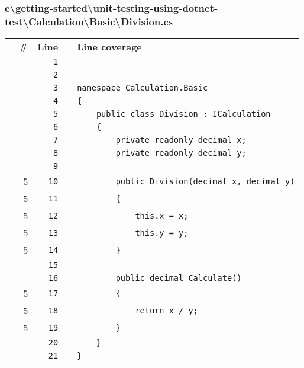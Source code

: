 \documentclass[a4paper,landscape,10pt]{article}
\begin{document}
\subsubsection{e\textbackslash getting-started\textbackslash unit-testing-using-dotnet-test\textbackslash Calculation\textbackslash Basic\textbackslash Division.cs}
\begin{longtable}[l]{lrrll}
\textbf{} & \textbf{\#} & \textbf{Line} & \textbf{} & \textbf{Line coverage}\\
\cellcolor{gray} &  & \verb~1~ & & \verb~~\\
\cellcolor{gray} &  & \verb~2~ & & \verb~~\\
\cellcolor{gray} &  & \verb~3~ & & \verb~namespace Calculation.Basic~\\
\cellcolor{gray} &  & \verb~4~ & & \verb~{~\\
\cellcolor{gray} &  & \verb~5~ & & \verb~    public class Division : ICalculation~\\
\cellcolor{gray} &  & \verb~6~ & & \verb~    {~\\
\cellcolor{gray} &  & \verb~7~ & & \verb~        private readonly decimal x;~\\
\cellcolor{gray} &  & \verb~8~ & & \verb~        private readonly decimal y;~\\
\cellcolor{gray} &  & \verb~9~ & & \verb~~\\
\cellcolor{green} & 5 & \verb~10~ & & \verb~        public Division(decimal x, decimal y)~\\
\cellcolor{green} & 5 & \verb~11~ & & \verb~        {~\\
\cellcolor{green} & 5 & \verb~12~ & & \verb~            this.x = x;~\\
\cellcolor{green} & 5 & \verb~13~ & & \verb~            this.y = y;~\\
\cellcolor{green} & 5 & \verb~14~ & & \verb~        }~\\
\cellcolor{gray} &  & \verb~15~ & & \verb~~\\
\cellcolor{gray} &  & \verb~16~ & & \verb~        public decimal Calculate()~\\
\cellcolor{green} & 5 & \verb~17~ & & \verb~        {~\\
\cellcolor{green} & 5 & \verb~18~ & & \verb~            return x / y;~\\
\cellcolor{green} & 5 & \verb~19~ & & \verb~        }~\\
\cellcolor{gray} &  & \verb~20~ & & \verb~    }~\\
\cellcolor{gray} &  & \verb~21~ & & \verb~}~\\
\end{longtable}
\newpage
\end{document}
